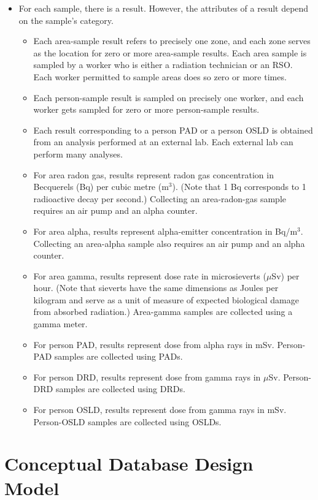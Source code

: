 \documentclass[12pt,a4paper]{article}
\begin{document}
\begin{itemize}
    \item For each sample, there is a result. However, the attributes of a result depend on the sample's category.
    \begin{itemize}
        \item Each area-sample result refers to precisely one zone, and each zone serves as the location for zero or more area-sample results. Each area sample is sampled by a worker who is either a radiation technician or an RSO. Each worker permitted to sample areas does so zero or more times.
        \item Each person-sample result is sampled on precisely one worker, and each worker gets sampled for zero or more person-sample results.
        \item Each result corresponding to a person PAD or a person OSLD is obtained from an analysis performed at an external lab. Each external lab can perform many analyses.
        \item For area radon gas, results represent radon gas concentration in Becquerels (Bq) per cubic metre (m$^3$). (Note that 1 Bq corresponds to 1 radioactive decay per second.) Collecting an area-radon-gas sample requires an air pump and an alpha counter.
        \item For area alpha, results represent alpha-emitter concentration in Bq/m$^3$. Collecting an area-alpha sample also requires an air pump and an alpha counter.
        \item For area gamma, results represent dose rate in microsieverts ($\mu$Sv) per hour. (Note that sieverts have the same dimensions as Joules per kilogram and serve as a unit of measure of expected biological damage from absorbed radiation.) Area-gamma samples are collected using a gamma meter.
        \item For person PAD, results represent dose from alpha rays in mSv. Person-PAD samples are collected using PADs.
        \item For person DRD, results represent dose from gamma rays in $\mu$Sv. Person-DRD samples are collected using DRDs.
        \item For person OSLD, results represent dose from gamma rays in mSv. Person-OSLD samples are collected using OSLDs.
    \end{itemize}
\end{itemize}

\section{Conceptual Database Design Model}
\end{document}
